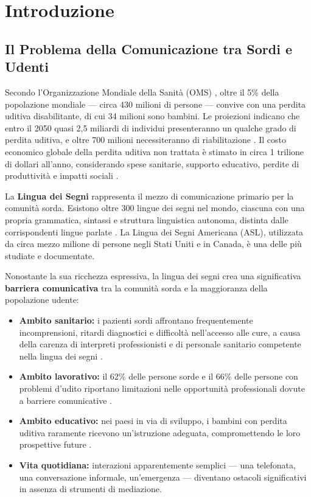 
\section{Introduzione}

\subsection{Il Problema della Comunicazione tra Sordi e Udenti}

Secondo l'Organizzazione Mondiale della Sanità (OMS) \cite{who2024deafness}, oltre il 5\% della popolazione mondiale --- circa 430 milioni di persone --- convive con una perdita uditiva disabilitante, di cui 34 milioni sono bambini. Le proiezioni indicano che entro il 2050 quasi 2,5 miliardi di individui presenteranno un qualche grado di perdita uditiva, e oltre 700 milioni necessiteranno di riabilitazione \cite{who2024deafness}. Il costo economico globale della perdita uditiva non trattata è stimato in circa 1 trilione di dollari all'anno, considerando spese sanitarie, supporto educativo, perdite di produttività e impatti sociali \cite{who2024hearingday}.

La \textbf{Lingua dei Segni} rappresenta il mezzo di comunicazione primario per la comunità sorda. Esistono oltre 300 lingue dei segni nel mondo, ciascuna con una propria grammatica, sintassi e struttura linguistica autonoma, distinta dalle corrispondenti lingue parlate \cite{wfd2024signlanguage}. La Lingua dei Segni Americana (ASL), utilizzata da circa mezzo milione di persone negli Stati Uniti e in Canada, è una delle più studiate e documentate.

Nonostante la sua ricchezza espressiva, la lingua dei segni crea una significativa \textbf{barriera comunicativa} tra la comunità sorda e la maggioranza della popolazione udente:
\begin{itemize}
    \item \textbf{Ambito sanitario:} i pazienti sordi affrontano frequentemente incomprensioni, ritardi diagnostici e difficoltà nell'accesso alle cure, a causa della carenza di interpreti professionisti e di personale sanitario competente nella lingua dei segni \cite{edf2023barriers}.
    \item \textbf{Ambito lavorativo:} il 62\% delle persone sorde e il 66\% delle persone con problemi d'udito riportano limitazioni nelle opportunità professionali dovute a barriere comunicative \cite{hamiltonrelay2023}.
    \item \textbf{Ambito educativo:} nei paesi in via di sviluppo, i bambini con perdita uditiva raramente ricevono un'istruzione adeguata, compromettendo le loro prospettive future \cite{who2024deafness}.
    \item \textbf{Vita quotidiana:} interazioni apparentemente semplici --- una telefonata, una conversazione informale, un'emergenza --- diventano ostacoli significativi in assenza di strumenti di mediazione.
\end{itemize}

